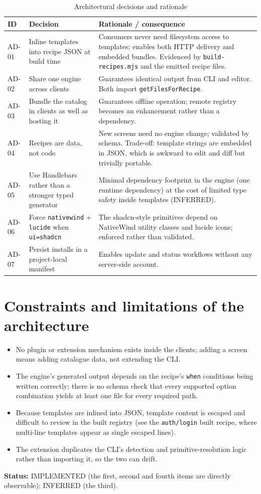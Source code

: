 \begin{longtable}{p{1.3cm}p{5.4cm}p{7.3cm}}
\caption{Architectural decisions and rationale}\\
\toprule
\textbf{ID} & \textbf{Decision} & \textbf{Rationale / consequence} \\
\midrule

AD-01 & Inline templates into recipe JSON at build time & Consumers never need
filesystem access to templates; enables both HTTP delivery and embedded bundles.
Evidenced by \texttt{build-recipes.mjs} and the emitted recipe files. \\
AD-02 & Share one engine across clients & Guarantees identical output from CLI and
editor. Both import \texttt{getFilesForRecipe}. \\
AD-03 & Bundle the catalog in clients as well as hosting it & Guarantees offline
operation; remote registry becomes an enhancement rather than a dependency. \\
AD-04 & Recipes are data, not code & New screens need no engine change; validated by
schema. Trade-off: template strings are embedded in JSON, which is awkward to edit
and diff but trivially portable. \\
AD-05 & Use Handlebars rather than a stronger typed generator & Minimal dependency
footprint in the engine (one runtime dependency) at the cost of limited type safety
inside templates (INFERRED). \\
AD-06 & Force \texttt{nativewind} + \texttt{lucide} when \texttt{ui=shadcn} & The
shadcn-style primitives depend on NativeWind utility classes and lucide icons;
enforced rather than validated. \\
AD-07 & Persist installs in a project-local manifest & Enables update and status
workflows without any server-side account. \\
\bottomrule
\end{longtable}

\section{Constraints and limitations of the architecture}

\begin{itemize}
  \item No plugin or extension mechanism exists inside the clients; adding a screen
        means adding catalogue data, not extending the CLI.
  \item The engine's generated output depends on the recipe's \texttt{when}
        conditions being written correctly; there is no schema check that every
        supported option combination yields at least one file for every required
        path.
  \item Because templates are inlined into JSON, template content is escaped and
        difficult to review in the built registry (see the \texttt{auth/login}
        built recipe, where multi-line templates appear as single escaped lines).
  \item The extension duplicates the CLI's detection and primitive-resolution logic
        rather than importing it, so the two can drift.
\end{itemize}

\textbf{Status:} IMPLEMENTED (the first, second and fourth items are directly
observable); INFERRED (the third).
